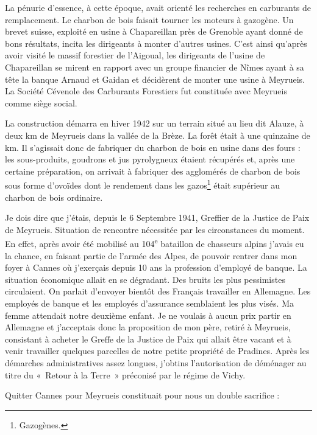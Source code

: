 La pénurie d’essence, à cette époque, avait orienté les recherches en carburants de
remplacement. Le charbon de bois faisait tourner les moteurs à gazogène. Un brevet suisse,
exploité en usine à Chapareillan près de Grenoble ayant donné de bons résultats, incita les
dirigeants à monter d’autres usines. C’est ainsi qu’après avoir visité le massif forestier de
l’Aigoual, les dirigeants de l’usine de Chapareillan se mirent en rapport avec un groupe
financier de Nîmes ayant à sa tête la banque Arnaud et Gaidan et décidèrent de monter une
usine à Meyrueis. La Société Cévenole des Carburants Forestiers fut constituée avec Meyrueis
comme siège social.


La construction démarra en hiver 1942 sur un terrain situé au lieu dit Alauze, à deux km de
Meyrueis dans la vallée de la Brèze. La forêt était à une quinzaine de km. Il s’agissait donc de
fabriquer du charbon de bois en usine dans des fours : les sous-produits, goudrons et jus
pyrolygneux étaient récupérés et, après une certaine préparation, on arrivait à fabriquer des
agglomérés de charbon de bois sous forme d’ovoïdes dont le rendement dans les gazos\footnote{Gazogènes.} était
supérieur au charbon de bois ordinaire.

Je dois dire que j’étais, depuis le 6 Septembre 1941, Greffier de la Justice de Paix de
Meyrueis. Situation de rencontre nécessitée par les circonstances du moment. En effet, après
avoir été mobilisé au 104\textsuperscript{e} bataillon de chasseurs alpins j’avais eu la chance, en faisant partie
de l’armée des Alpes, de pouvoir rentrer dans mon foyer à Cannes où j’exerçais depuis 10 ans
la profession d’employé de banque. La situation économique allait en se dégradant. Des bruits
les plus pessimistes circulaient. On parlait d’envoyer bientôt des Français travailler en
Allemagne. Les employés de banque et les employés d’assurance semblaient les plus visés.
Ma femme attendait notre deuxième enfant. Je ne voulais à aucun prix partir en Allemagne et
j’acceptais donc la proposition de mon père, retiré à Meyrueis, consistant à acheter le Greffe
de la Justice de Paix qui allait être vacant et à venir travailler quelques parcelles de notre
petite propriété de Pradines. Après les démarches administratives assez longues, j’obtins
l’autorisation de déménager au titre du «~Retour à la Terre~» préconisé par le régime de
Vichy.

Quitter Cannes pour Meyrueis constituait pour nous un double sacrifice :

